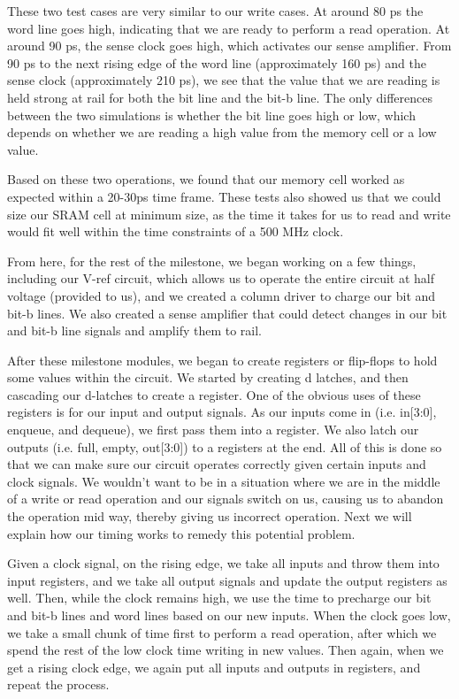 \documentclass[11pt]{article}
\theoremstyle{definition}
\begin{document}
\begin{enumerate}
\begin{enumerate}
These two test cases are very similar to our write cases. At around 80 ps the word line goes high, indicating that we are ready to perform a read operation. At around 90 ps, the sense clock goes high, which activates our sense amplifier. From 90 ps to the next rising edge of the word line (approximately 160 ps) and the sense clock (approximately 210 ps), we see that the value that we are reading is held strong at rail for both the bit line and the bit-b line. The only differences between the two simulations is whether the bit line goes high or low, which depends on whether we are reading a high value from the memory cell or a low value. 

\end{enumerate}

Based on these two operations, we found that our memory cell worked as expected within a 20-30ps time frame. These tests also showed us that we could size our SRAM cell at minimum size, as the time it takes for us to read and write would fit well within the time constraints of a 500 MHz clock. 

From here, for the rest of the milestone, we began working on a few things, including our V-ref circuit, which allows us to operate the entire circuit at half voltage (provided to us), and we created a column driver to charge our bit and bit-b lines. We also created a sense amplifier that could detect changes in our bit and bit-b line signals and amplify them to rail. 

After these milestone modules, we began to create registers or flip-flops to hold some values within the circuit. We started by creating d latches, and then cascading our d-latches to create a register. One of the obvious uses of these registers is for our input and output signals. As our inputs come in (i.e. in[3:0], enqueue, and dequeue), we first pass them into a register. We also latch our outputs (i.e. full, empty, out[3:0]) to a registers at the end. All of this is done so that we can make sure our circuit operates correctly given certain inputs and clock signals. We wouldn't want to be in a situation where we are in the middle of a write or read operation and our signals switch on us, causing us to abandon the operation mid way, thereby giving us incorrect operation. Next we will explain how our timing works to remedy this potential problem.

Given a clock signal, on the rising edge, we take all inputs and throw them into input registers, and we take all output signals and update the output registers as well. Then, while the clock remains high, we use the time to precharge our bit and bit-b lines and word lines based on our new inputs. When the clock goes low, we take a small chunk of time first to perform a read operation, after which we spend the rest of the low clock time writing in new values. Then again, when we get a rising clock edge, we again put all inputs and outputs in registers, and repeat the process.


\end{enumerate}
\end{document}
